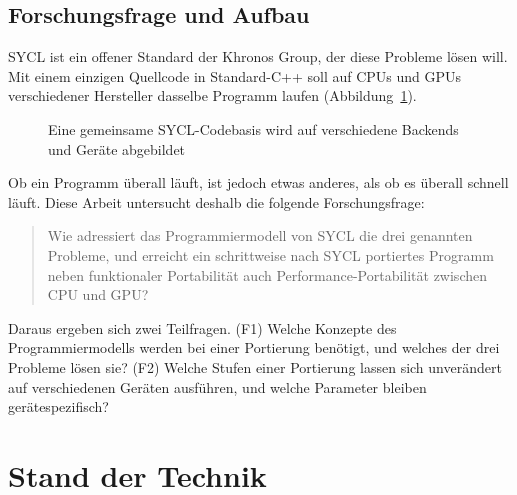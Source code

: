 \documentclass[12pt,a4paper]{article}
\begin{document}
\subsection{Forschungsfrage und Aufbau}\label{sec:frage}

SYCL ist ein offener Standard der Khronos Group, der diese Probleme lösen
will. Mit einem einzigen Quellcode in Standard-C++ soll auf CPUs und GPUs
verschiedener Hersteller dasselbe Programm laufen \cite{khronos2020sycl}
(Abbildung~\ref{fig:codebasen}).

\begin{figure}[htbp]
\centering
{}
\caption[SYCL-Codebasis für mehrere Backends]{Eine gemeinsame SYCL-Codebasis wird auf verschiedene Backends und Geräte abgebildet}
\label{fig:codebasen}
\end{figure}

Ob ein Programm überall läuft, ist jedoch etwas anderes, als ob es überall
schnell läuft. Diese Arbeit untersucht deshalb die folgende Forschungsfrage:

\begin{quote}
Wie adressiert das Programmiermodell von SYCL die drei genannten
Probleme, und erreicht ein schrittweise nach SYCL portiertes Programm neben
funktionaler Portabilität auch Performance-Portabilität zwischen CPU und
GPU?
\end{quote}

\noindent Daraus ergeben sich zwei Teilfragen. (F1) Welche Konzepte des
Programmiermodells werden bei einer Portierung benötigt, und welches der
drei Probleme lösen sie? (F2) Welche Stufen einer Portierung lassen sich
unverändert auf verschiedenen Geräten ausführen, und welche Parameter
bleiben gerätespezifisch?

\section{Stand der Technik}\label{sec:stand}
\end{document}
